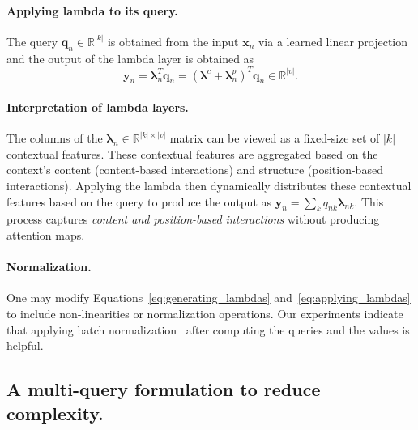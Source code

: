 \documentclass{article} \usepackage{iclr2021_conference,times}
\begin{document}
\vspace{-0.1cm}
\paragraph{Applying lambda to its query.}
The query $\boldsymbol{q}_n \in \mathbb{R}^{|k|}$ is obtained from the input $\boldsymbol{x}_n$ via a learned linear projection and the output of the lambda layer is obtained as
\begin{equation}
    \label{eq:applying_lambdas}
    \boldsymbol{y}_n = \boldsymbol{\lambda}_n^T \boldsymbol{q}_n = (\boldsymbol{\lambda}^c + \boldsymbol{\lambda}^p_n)^T \boldsymbol{q}_n \in \mathbb{R}^{|v|}.
\end{equation}

\vspace{-0.1cm}
\paragraph{Interpretation of lambda layers.}
The columns of the $\boldsymbol{\lambda}_n \in \mathbb{R}^{|k| \times |v|}$ matrix can be viewed as a fixed-size set of $|k|$ contextual features.
These contextual features are aggregated based on the context's content (content-based interactions) and structure (position-based interactions).
Applying the lambda then dynamically distributes these contextual features based on the query to produce the output as $\boldsymbol{y}_n=\sum_k q_{nk} \boldsymbol{\lambda}_{nk}$.
This process captures \emph{content and position-based interactions} without producing attention maps.

\vspace{-0.1cm}
\paragraph{Normalization.}
One may modify Equations~\ref{eq:generating_lambdas} and~\ref{eq:applying_lambdas} to include non-linearities or normalization operations.
Our experiments indicate that applying batch normalization~\citep{BatchNorm} after computing the queries and the values is helpful.

\subsection{A multi-query formulation to reduce complexity.}
\end{document}

